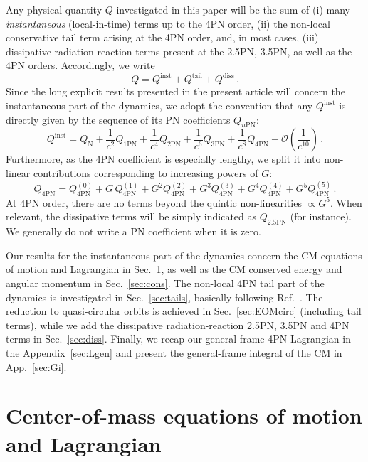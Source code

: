 \documentclass[prd,preprint,superscriptaddress,tightenlines,nofootinbib,
  eqsecnum,showpacs]{revtex4}
\begin{document}
Any physical quantity $Q$ investigated in this paper will be the sum of (i) many
\textit{instantaneous} (local-in-time) terms up to the 4PN order, (ii) the non-local
conservative tail term arising at the 4PN order, and, in most cases, (iii)
dissipative radiation-reaction terms present at the 2.5PN, 3.5PN, as well as the 4PN
orders. Accordingly, we write
%
\begin{equation}\label{Qfull}
Q = Q^\text{inst} + Q^\text{tail} + Q^\text{diss}\,.
\end{equation}
%
Since the long explicit results presented in the present article will concern the
instantaneous part of the dynamics, we adopt the convention that any
$Q^\text{inst}$ is directly given by the sequence of its PN coefficients
$Q_{n\text{PN}}$:
%
\begin{equation}\label{notationQ}
Q^\text{inst} = Q_\text{N} +
\frac{1}{c^2}Q_\text{1PN} +
\frac{1}{c^4}Q_\text{2PN} +
\frac{1}{c^6}Q_\text{3PN} +
\frac{1}{c^8}Q_\text{4PN} + \mathcal{O}\left(\frac{1}{c^{10}}\right)\,.
\end{equation}
%
Furthermore, as the 4PN coefficient is especially lengthy, we split it
into non-linear contributions corresponding to increasing powers of $G$:
%
\begin{equation}\label{notationQG}
Q_\text{4PN} = Q^{(0)}_\text{4PN} + G\,Q^{(1)}_\text{4PN} + G^2 Q^{(2)}_\text{4PN} 
+ G^3 Q^{(3)}_\text{4PN}+ G^4 Q^{(4)}_\text{4PN}+ G^5 Q^{(5)}_\text{4PN} \,.
\end{equation}
%
At 4PN order, there are no terms beyond the quintic non-linearities
$\propto G^5$. When relevant, the dissipative terms will be simply indicated
as $Q_\text{2.5PN}$ (for instance). We generally do not write a PN coefficient when it is zero.

Our results for the instantaneous part of the dynamics concern the CM
equations of motion and Lagrangian in Sec.~\ref{sec:Lag}, as well as the CM
conserved energy and angular momentum in Sec.~\ref{sec:cons}. The non-local
4PN tail part of the dynamics is investigated in Sec.~\ref{sec:tails},
basically following Ref.~\cite{BBBFMb}. The reduction to
quasi-circular orbits is achieved in Sec.~\ref{sec:EOMcirc} (including tail terms), while we add the
dissipative radiation-reaction 2.5PN, 3.5PN and 4PN terms in
Sec.~\ref{sec:diss}. Finally, we recap our general-frame 4PN Lagrangian in the
Appendix~\ref{sec:Lgen} and present the general-frame integral of the CM in
App.~\ref{sec:Gi}.

\section{Center-of-mass equations of motion and Lagrangian} 
\label{sec:Lag} 
\end{document}
